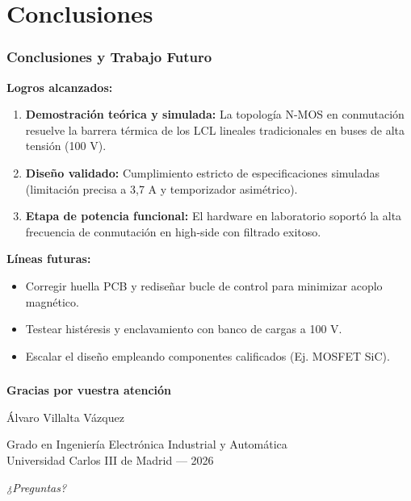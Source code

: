 \documentclass[aspectratio=169]{beamer}
\begin{document}
\section{Conclusiones}

\begin{frame}
\frametitle{Conclusiones y Trabajo Futuro}

\textbf{Logros alcanzados:}
\begin{enumerate}
  \item \textbf{Demostración teórica y simulada:} La topología N-MOS en conmutación resuelve la barrera térmica de los LCL lineales tradicionales en buses de alta tensión (100 V).
  \item \textbf{Diseño validado:} Cumplimiento estricto de especificaciones simuladas (limitación precisa a 3,7 A y temporizador asimétrico).
  \item \textbf{Etapa de potencia funcional:} El hardware en laboratorio soportó la alta frecuencia de conmutación en high-side con filtrado exitoso.
\end{enumerate}

\vspace{0.3cm}
\textbf{Líneas futuras:}
\begin{itemize}
  \item Corregir huella PCB y rediseñar bucle de control para minimizar acoplo magnético.
  \item Testear histéresis y enclavamiento con banco de cargas a 100 V.
  \item Escalar el diseño empleando componentes calificados (Ej. MOSFET SiC).
\end{itemize}

\end{frame}

\begin{frame}
\frametitle{}
\vspace{1.5cm}
\begin{center}
{\Large \textbf{Gracias por vuestra atención}}

\vspace{1cm}
{\large Álvaro Villalta Vázquez}

\vspace{0.4cm}
{\normalsize Grado en Ingeniería Electrónica Industrial y Automática}\\
{\normalsize Universidad Carlos III de Madrid — 2026}

\vspace{1cm}
\textit{¿Preguntas?}
\end{center}
\end{frame}
\end{document}
